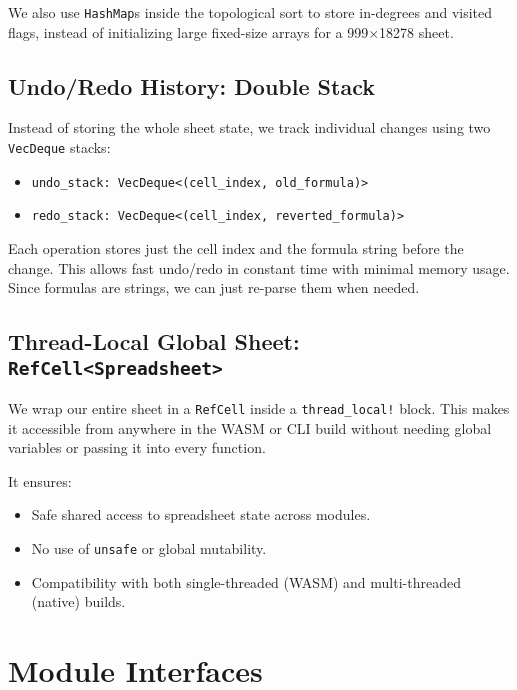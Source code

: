 \documentclass[12pt]{article}
\begin{document}
    We also use \texttt{HashMap}s inside the topological sort to store in-degrees and visited flags, instead of initializing large fixed-size arrays for a 999×18278 sheet.

    \subsection{Undo/Redo History: Double Stack}

    Instead of storing the whole sheet state, we track individual changes using two \texttt{VecDeque} stacks:

    \begin{itemize}
        \item \texttt{undo\_stack: VecDeque<(cell\_index, old\_formula)>}
        \item \texttt{redo\_stack: VecDeque<(cell\_index, reverted\_formula)>}
    \end{itemize}

    Each operation stores just the cell index and the formula string before the change. This allows fast undo/redo in constant time with minimal memory usage. Since formulas are strings, we can just re-parse them when needed.

    \subsection{Thread-Local Global Sheet: \texttt{RefCell<Spreadsheet>}}

    We wrap our entire sheet in a \texttt{RefCell} inside a \texttt{thread\_local!} block. This makes it accessible from anywhere in the WASM or CLI build without needing global variables or passing it into every function.

    It ensures:
    \begin{itemize}
        \item Safe shared access to spreadsheet state across modules.
        \item No use of \texttt{unsafe} or global mutability.
        \item Compatibility with both single-threaded (WASM) and multi-threaded (native) builds. \\
    \end{itemize}

    \section{Module Interfaces}
\end{document}
